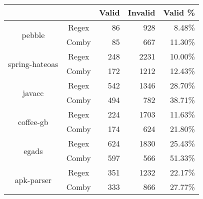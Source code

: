 \documentclass[sigconf,review, anonymous]{acmart}
\begin{document}
{\begin{table}[hbtp]
{\begin{tabular}{|c|c|c|r|r|r|}
\hline
 & \multicolumn{2}{c|}{} & \textbf{Valid} & \textbf{Invalid} & \textbf{Valid \%}  \\ \hline
\multirow{2}{*}{pebble} & \multicolumn{2}{c|}{Regex} & 86 \hspace{8pt} & 928 \hspace{8pt} & 8.48\%  \\\cline{2-6}
    & \multicolumn{2}{c|}{Comby} & 85 \hspace{8pt} & 667 \hspace{8pt} & 11.30\% \\ \hline
\multirow{2}{*}{spring-hateoas} & \multicolumn{2}{c|}{Regex} & 248 \hspace{8pt} & 2231 \hspace{8pt} & 10.00\% \\\cline{2-6}
    & \multicolumn{2}{c|}{Comby} & 172 \hspace{8pt} & 1212 \hspace{8pt} & 12.43\% \\ \hline
\multirow{2}{*}{javacc} & \multicolumn{2}{c|}{Regex} & 542 \hspace{8pt} & 1346 \hspace{8pt} & 28.70\% \\\cline{2-6}
    & \multicolumn{2}{c|}{Comby} & 494 \hspace{8pt} & 782 \hspace{8pt} & 38.71\% \\ \hline
    
\multirow{2}{*}{coffee-gb} & \multicolumn{2}{c|}{Regex} & 224 \hspace{8pt} & 1703 \hspace{8pt} & 11.63\% \\\cline{2-6}
    & \multicolumn{2}{c|}{Comby} & 174 \hspace{8pt} & 624 \hspace{8pt} & 21.80\% \\ \hline
\multirow{2}{*}{egads} & \multicolumn{2}{c|}{Regex} & 624 \hspace{8pt} & 1830 \hspace{8pt} & 25.43\% \\\cline{2-6}
    & \multicolumn{2}{c|}{Comby} & 597 \hspace{8pt} & 566 \hspace{8pt} & 51.33\% \\ \hline
\multirow{2}{*}{apk-parser} & \multicolumn{2}{c|}{Regex} & 351 \hspace{8pt} & 1232 \hspace{8pt} & 22.17\% \\\cline{2-6}
    & \multicolumn{2}{c|}{Comby} & 333 \hspace{8pt} & 866 \hspace{8pt} & 27.77\% \\ \hline


\end{tabular}}
\end{table}}
\end{document}
